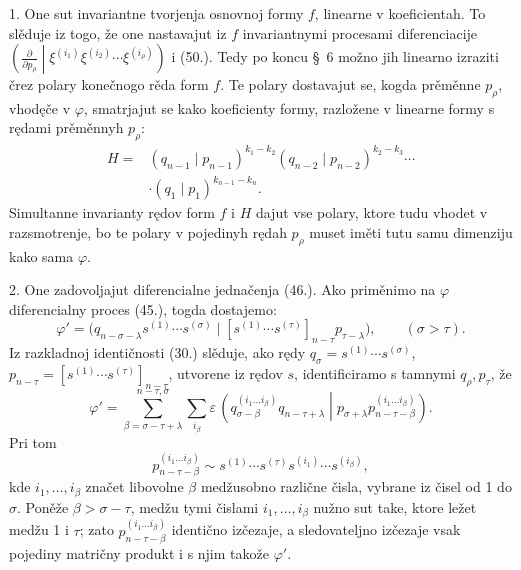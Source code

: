 \documentclass[11pt]{article}
\newcommand{\pair}[2]{\left(#1\middle|#2\right)}
\newcommand{\eps}{\varepsilon}
\begin{document}
1. One sut invariantne tvorjenja osnovnoj formy $f$, linearne v koeficientah. To slěduje iz togo, že one nastavajut iz $f$ invariantnymi procesami diferenciacije
$\left(\frac{\partial}{\partial p_\rho}\middle|\xi^{(i_1)}\xi^{(i_2)}\cdots\xi^{(i_\rho)}\right)$ i (50.). Tedy po koncu \S\ 6 možno jih linearno izraziti črez polary konečnogo rěda form $f$. Te polary dostavajut se, kogda prěměnne $p_\rho$, vhodęče v $\varphi$, smatrjajut se kako koeficienty formy, razložene v linearne formy s rędami prěměnnyh $p_\rho$:
\begin{equation}
\begin{aligned}
 H={}&(q_{n-1}\mid p_{n-1})^{k_1-k_2}
(q_{n-2}\mid p_{n-2})^{k_2-k_3}\cdots\\
&\cdot(q_1\mid p_1)^{k_{n-1}-k_n}.
\end{aligned}
\tag{52}
\end{equation}
Simultanne invarianty rędov form $f$ i $H$ dajut vse polary, ktore tudu vhodet v razsmotrenje, bo te polary v pojedinyh rędah $p_\rho$ muset iměti tutu samu dimenziju kako sama $\varphi$.

2. One zadovoljajut diferencialne jednačenja (46.). Ako priměnimo na $\varphi$ diferencialny proces (45.), togda dostajemo:
\[
 \varphi'=\bigl(q_{n-\sigma-\lambda}s^{(1)}\cdots s^{(\sigma)}\mid [s^{(1)}\cdots s^{(\tau)}]_{n-\tau}p_{\tau-\lambda}\bigr),\qquad (\sigma>\tau).
\]
Iz razkladnoj identičnosti (30.) slěduje, ako rędy $q_\sigma=s^{(1)}\cdots s^{(\sigma)}$, $p_{n-\tau}=[s^{(1)}\cdots s^{(\tau)}]_{n-\tau}$, utvorene iz rędov $s$, identificiramo s tamnymi $q_\rho,p_\tau$, že
\[
 \varphi'=\sum_{\beta=\sigma-\tau+\lambda}^{n-\tau,\sigma}\sum_{i_\beta}\eps\,
 \pair{q_{\sigma-\beta}^{(i_1\ldots i_\beta)}q_{n-\tau+\lambda}}{p_{\sigma+\lambda}p_{n-\tau-\beta}^{(i_1\ldots i_\beta)}}.
\]
Pri tom
\[
 p_{n-\tau-\beta}^{(i_1\ldots i_\beta)}\sim s^{(1)}\cdots s^{(\tau)}s^{(i_1)}\cdots s^{(i_\beta)},
\]
kde $i_1,\ldots,i_\beta$ značet libovolne $\beta$ medžusobno različne čisla, vybrane iz čisel od 1 do $\sigma$. Poněže $\beta>\sigma-\tau$, medžu tymi čislami $i_1,\ldots,i_\beta$ nužno sut take, ktore ležet medžu 1 i $\tau$; zato $p_{n-\tau-\beta}^{(i_1\ldots i_\beta)}$ identično izčezaje, a sledovateljno izčezaje vsak pojediny matričny produkt i s njim takože $\varphi'$.
\end{document}

